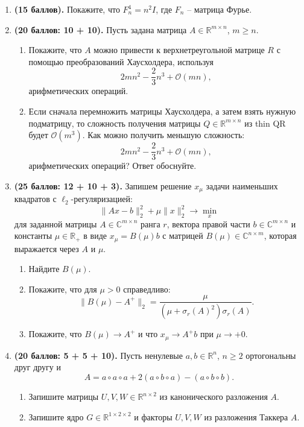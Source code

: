 \documentclass{article}
\begin{document}
\begin{enumerate}
    \item \textbf{(15 баллов).} Покажите, что $F_n^4 = n^2 I$, где $F_n$ -- матрица Фурье.
    \item \textbf{(20 баллов: 10 + 10).} Пусть задана матрица $A\in\mathbb{R}^{m\times n}$, $m\geq n$. 
    \begin{enumerate}
    \item Покажите, что $A$ можно привести к верхнетреугольной матрице $R$ с помощью преобразований Хаусхолдера, используя 
    \[ 
        2mn^2 - \frac{2}{3} n^3 + \mathcal{O}(mn),
    \]
    арифметических операций. 
    \item Если сначала перемножить матрицы Хаусхолдера, а затем взять нужную подматрицу, то сложность получения матрицы $Q\in\mathbb{R}^{m\times n}$ из thin QR будет $\mathcal{O}(m^3)$. Как можно получить меньшую сложность:
    \[ 
        2mn^2 - \frac{2}{3} n^3 + \mathcal{O}(mn),
    \]
    арифметических операций? Ответ обоснуйте.
    \end{enumerate}
     \item \textbf{(25 баллов: 12 + 10 + 3).} Запишем решение $x_\mu$ задачи наименьших квадратов с $\ell_2$-регуляризацией:
    \[
        \|Ax - b\|_2^2 + \mu \|x\|_2^2 \to \min_x
    \]
    для заданной матрицы $A\in\mathbb{C}^{m\times n}$ ранга $r$, вектора правой части $b\in\mathbb{C}^{m\times n}$ и константы $\mu\in\mathbb{R}_+$ в виде
    $x_\mu = B(\mu) b$
    с матрицей $B(\mu)\in \mathbb{C}^{n\times m}$, которая выражается через $A$ и $\mu$.
    \begin{enumerate}
    \item Найдите $B(\mu)$.
    \item Покажите, что для $\mu>0$ справедливо:
    \[
        \|B(\mu) - A^+\|_2 = \frac{\mu}{\left(\mu + \sigma_r(A)^2\right)\sigma_r(A)}.
    \]
    \item Покажите, что $B(\mu)\to A^+$ и что $x_\mu\to A^+b$ при $\mu\to +0$.
    \end{enumerate}
    \item \textbf{(20 баллов: 5 + 5 + 10).}
    Пусть ненулевые $a, b\in\mathbb{R}^{n}$, $n\geq 2$ ортогональны друг другу и 
    \[
        A = a \circ a \circ a + 2 (a \circ b \circ a) - (a \circ b \circ b).
    \]
    \begin{enumerate}
        \item Запишите матрицы $U,V,W \in\mathbb{R}^{n\times 2}$ из канонического разложения $A$. 
        \item Запишите ядро $G \in\mathbb{R}^{1\times 2 \times 2}$ и факторы $U,V,W$ из разложения Таккера $A$.

\end{enumerate}
\end{enumerate}
\end{document}
